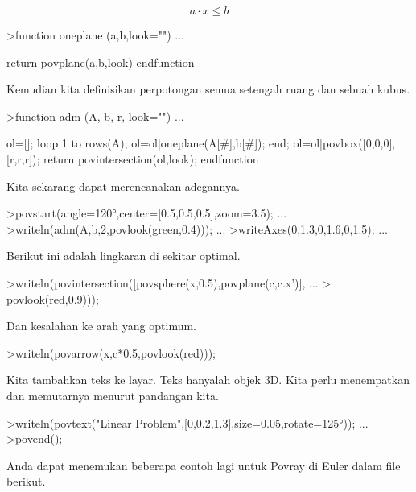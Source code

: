 \documentclass{article}
\begin{document}
\begin{eulernotebook}
\begin{eulercomment}
\begin{eulercomment}
\begin{eulercomment}
\end{eulercomment}
\begin{eulerformula}
\[
a \cdot x \le b
\]
\end{eulerformula}
\begin{eulerprompt}
>function oneplane (a,b,look="") ...
\end{eulerprompt}
\begin{eulerudf}
    return povplane(a,b,look)
  endfunction
\end{eulerudf}
\begin{eulercomment}
Kemudian kita definisikan perpotongan semua setengah ruang dan sebuah
kubus.
\end{eulercomment}
\begin{eulerprompt}
>function adm (A, b, r, look="") ...
\end{eulerprompt}
\begin{eulerudf}
    ol=[];
    loop 1 to rows(A); ol=ol|oneplane(A[#],b[#]); end;
    ol=ol|povbox([0,0,0],[r,r,r]);
    return povintersection(ol,look);
  endfunction
\end{eulerudf}
\begin{eulercomment}
Kita sekarang dapat merencanakan adegannya.
\end{eulercomment}
\begin{eulerprompt}
>povstart(angle=120°,center=[0.5,0.5,0.5],zoom=3.5); ...
>writeln(adm(A,b,2,povlook(green,0.4))); ...
>writeAxes(0,1.3,0,1.6,0,1.5); ...
\end{eulerprompt}
\begin{eulercomment}
Berikut ini adalah lingkaran di sekitar optimal.
\end{eulercomment}
\begin{eulerprompt}
>writeln(povintersection([povsphere(x,0.5),povplane(c,c.x')], ...
>  povlook(red,0.9)));
\end{eulerprompt}
\begin{eulercomment}
Dan kesalahan ke arah yang optimum.
\end{eulercomment}
\begin{eulerprompt}
>writeln(povarrow(x,c*0.5,povlook(red)));
\end{eulerprompt}
\begin{eulercomment}
Kita tambahkan teks ke layar. Teks hanyalah objek 3D. Kita perlu
menempatkan dan memutarnya menurut pandangan kita.
\end{eulercomment}
\begin{eulerprompt}
>writeln(povtext("Linear Problem",[0,0.2,1.3],size=0.05,rotate=125°)); ...
>povend();
\end{eulerprompt}
\begin{eulercomment}
Anda dapat menemukan beberapa contoh lagi untuk Povray di Euler dalam
file berikut.


\end{eulercomment}
\end{eulercomment}
\end{eulercomment}
\end{eulernotebook}
\end{document}
